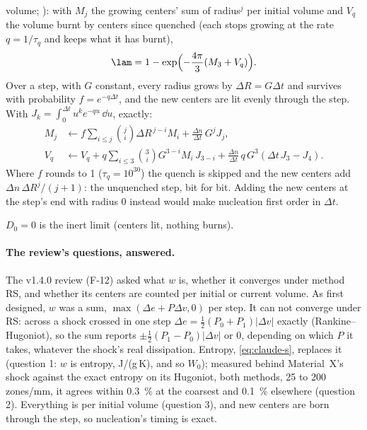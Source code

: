 \begin{enumerate}
  volume; \cite{farjas2006}): with $M_j$ the growing centers' sum of
  radius$^j$ per initial volume and $V_q$ the volume burnt by centers since
  quenched (each stops growing at the rate $q = 1/\tau_q$ and keeps what it
  has burnt),
  \begin{equation}
    \lam = 1 - \exp\Bigl(-\frac{4\pi}{3}(M_3 + V_q)\Bigr).
    \label{eq:claude}
  \end{equation}
  Over a step, with $G$ constant, every radius grows by $\Delta R = G\Delta
  t$ and survives with probability $f = e^{-q\Delta t}$, and the new
  centers are lit evenly through the step. With $J_k = \int_0^{\Delta t}
  u^k e^{-qu}\,\dd u$, exactly:
  \begin{align}
    M_j &\leftarrow f\sum_{i \le j}\binom{j}{i}\Delta R^{\,j-i} M_i
          + \frac{\Delta n}{\Delta t}\,G^j J_j, \\
    V_q &\leftarrow V_q + q\sum_{i \le 3}\binom{3}{i} G^{3-i} M_i\,J_{3-i}
          + \frac{\Delta n}{\Delta t}\,q\,G^3(\Delta t\,J_3 - J_4).
  \end{align}
  Where $f$ rounds to 1 ($\tau_q = 10^{30}$) the quench is skipped and the
  new centers add $\Delta n\,\Delta R^j/(j+1)$: the unquenched step, bit for
  bit. Adding the new centers at the step's end with radius 0 instead would
  make nucleation first order in $\Delta t$.
\end{enumerate}
$D_0 = 0$ is the inert limit (centers lit, nothing burns).

\paragraph{The review's questions, answered.} The v1.4.0 review (F-12)
asked what $w$ is, whether it converges under method RS, and whether its
centers are counted per initial or current volume. As first designed, $w$
was a sum, $\max(\Delta e + P\Delta v, 0)$ per step. It can not converge
under RS: across a shock crossed in one step $\Delta e = \frac12(P_0 +
P_1)|\Delta v|$ exactly (Rankine--Hugoniot), so the sum reports $\pm\frac12(P_1
- P_0)|\Delta v|$ or 0, depending on which $P$ it takes, whatever the shock's
real dissipation. Entropy, \cref{eq:claude-s}, replaces it (question 1: $w$
is entropy, J/(g\,K), and so $W_0$); measured behind Material~X's shock
against the exact entropy on its Hugoniot, both methods, 25 to 200
zones/mm, it agrees within 0.3~\% at the coarsest and 0.1~\% elsewhere
(question 2). Everything is per initial volume (question 3), and new
centers are born through the step, so nucleation's timing is exact.

